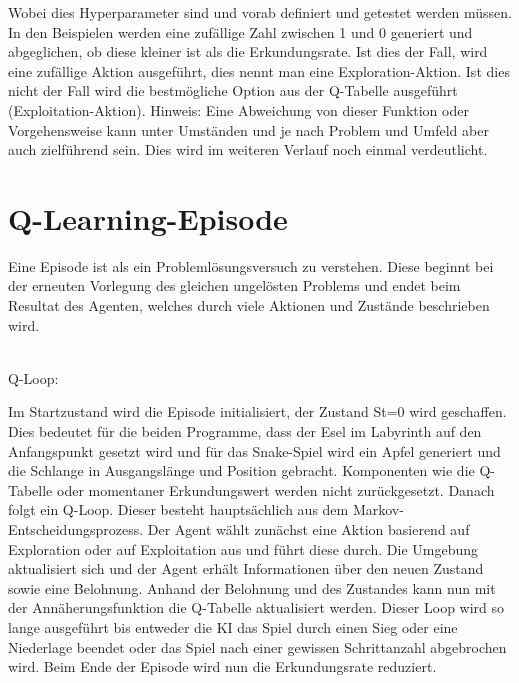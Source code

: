 \documentclass[12pt,titlepage]{article}
\begin{document}
Wobei dies Hyperparameter sind und vorab definiert und getestet werden müssen. 
In den Beispielen werden eine zufällige Zahl zwischen 1 und 0 generiert und abgeglichen, ob diese kleiner ist als die Erkundungsrate. Ist dies der Fall, wird eine zufällige Aktion ausgeführt, dies nennt man eine Exploration-Aktion. Ist dies nicht der Fall wird die bestmögliche Option aus der Q-Tabelle ausgeführt (Exploitation-Aktion).
Hinweis: Eine Abweichung von dieser Funktion oder Vorgehensweise kann unter Umständen und je nach Problem und Umfeld aber auch zielführend sein. Dies wird im weiteren Verlauf noch einmal verdeutlicht.

\section{Q-Learning-Episode}
Eine Episode ist als ein Problemlösungsversuch zu verstehen. Diese beginnt bei der erneuten Vorlegung des gleichen ungelösten Problems und endet beim Resultat des Agenten, welches durch viele Aktionen und Zustände beschrieben wird.
\\\\
\begin{center}
\end{center}
Q-Loop:
\begin{center}
\end{center}
Im Startzustand wird die Episode initialisiert, der Zustand St=0 wird geschaffen. Dies bedeutet für die beiden Programme, dass der Esel im Labyrinth auf den Anfangspunkt gesetzt wird und für das Snake-Spiel wird ein Apfel generiert und die Schlange in Ausgangslänge und Position gebracht. Komponenten wie die Q-Tabelle oder momentaner Erkundungswert werden nicht zurückgesetzt.
Danach folgt ein Q-Loop. Dieser besteht hauptsächlich aus dem Markov-Entscheidungsprozess. Der Agent wählt zunächst eine Aktion basierend auf Exploration oder auf Exploitation aus und führt diese durch. Die Umgebung aktualisiert sich und der Agent erhält Informationen über den neuen Zustand sowie eine Belohnung. Anhand der Belohnung und des Zustandes kann nun mit der Annäherungsfunktion die Q-Tabelle aktualisiert werden. Dieser Loop wird so lange ausgeführt bis entweder die KI das Spiel durch einen Sieg oder eine Niederlage beendet oder das Spiel nach einer gewissen Schrittanzahl abgebrochen wird. 
Beim Ende der Episode wird nun die Erkundungsrate reduziert.
\end{document}
